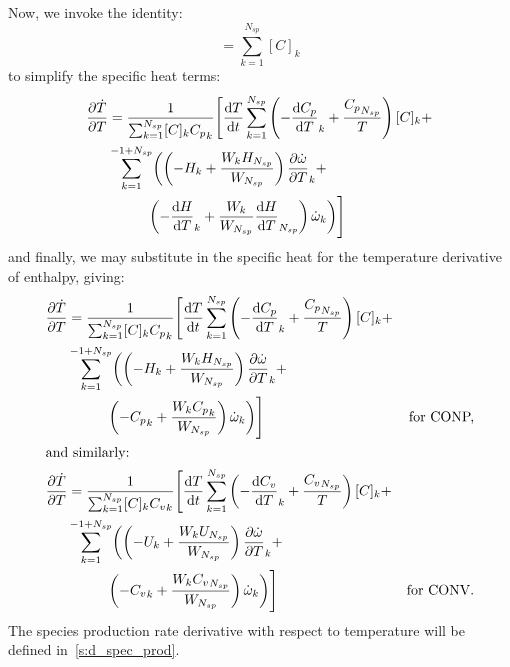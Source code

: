 \documentclass[12pt]{article}
\newcommand{\ns}{N_{sp}}
\newcommand{\conp}{CONP}
\newcommand{\conv}{CONV}
\newcommand{\dconp}{\ifmmode\text{for \conp,}\else for \conp,\fi}
\newcommand{\dconv}{\ifmmode\text{for \conv,}\else for \conv.\fi}
\begin{document}
Now, we invoke the identity:
\begin{equation}
 [C] = \sum_{k=1}^{\ns} [C]_{k}
\end{equation}
to simplify the specific heat terms:
\begin{align}
 \frac{\partial\dot{T}}{\partial{T}} &= \frac{1}{\sum_{k=1}^{\ns} [C]_{k} {C_p}_{k}} \Biggl[ \frac{\text{d} T }{\text{d} t } \sum_{k=1}^{\ns} \left(- \frac{\text{d} {C_p} }{\text{d} T }_{k} + \frac{{C_p}_{\ns}}{T}\right) [C]_{k} + \nonumber \\
				     & \sum_{k=1}^{-1 + \ns} \biggl(\left(- H_{k} + \frac{W_{k} H_{\ns}}{W_{\ns}}\right) \frac{\partial \dot{\omega} }{\partial T }_{k} + \nonumber \\
				     & \mathindent[larger] \left(- \frac{\text{d} H }{\text{d} T }_{k} + \frac{W_{k}}{W_{\ns}} \frac{\text{d} H }{\text{d} T }_{\ns}\right) \dot{\omega}_{k}\biggr)\Biggr]
\end{align}
and finally, we may substitute in the specific heat for the temperature derivative of enthalpy, giving:
\begin{subequations}
\begin{align}
 \frac{\partial\dot{T}}{\partial{T}} &= \frac{1}{\sum_{k=1}^{\ns} [C]_{k} {C_p}_{k}} \Biggl[ \frac{\text{d} T }{\text{d} t } \sum_{k=1}^{\ns} \left(- \frac{\text{d} {C_p} }{\text{d} T }_{k} + \frac{{C_p}_{\ns}}{T}\right) [C]_{k} + & \nonumber \\
				     & \sum_{k=1}^{-1 + \ns} \biggl( \left(- H_{k} + \frac{W_{k} H_{\ns}}{W_{\ns}}\right) \frac{\partial \dot{\omega} }{\partial T }_{k} + & \nonumber \\
				     & \mathindent[larger] \left(- {C_p}_{k} + \frac{W_{k} {C_p}_{k} }{W_{\ns}} \right) \dot{\omega}_{k}\biggr)\Biggr] & \text{\dconp} \\
\intertext{and similarly:}
\frac{\partial\dot{T}}{\partial{T}}  &= \frac{1}{\sum_{k=1}^{\ns} [C]_{k} {C_v}_{k}} \Biggl[ \frac{\text{d} T }{\text{d} t } \sum_{k=1}^{\ns} \left(- \frac{\text{d} {C_v} }{\text{d} T }_{k} + \frac{{C_v}_{\ns}}{T}\right) [C]_{k} + & \nonumber \\
				     & \sum_{k=1}^{-1 + \ns} \biggl(\left(- U_{k} + \frac{W_{k} U_{\ns}}{W_{\ns}}\right) \frac{\partial \dot{\omega} }{\partial T }_{k} + & \nonumber \\
				     & \mathindent[larger] \left(- {C_v}_{k} + \frac{W_{k} {C_v}_{\ns}}{W_{\ns}}\right) \dot{\omega}_{k}\biggr)\Biggr] & \text{\dconv}
\end{align}
\end{subequations}
The species production rate derivative with respect to temperature will be defined in~\cref{s:d_spec_prod}.
\end{document}
